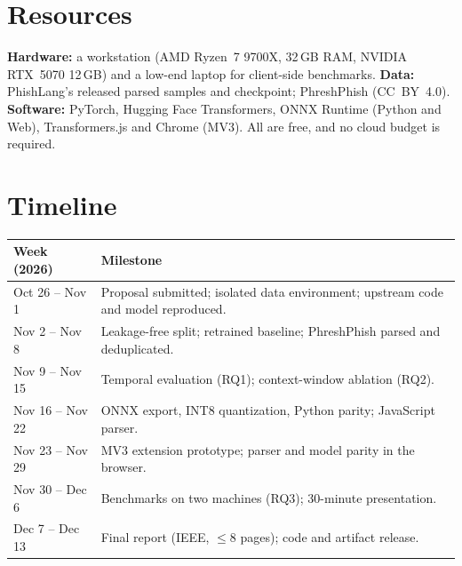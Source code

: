 \documentclass[11pt]{article}
\begin{document}
\section{Resources}
\textbf{Hardware:} a workstation (AMD Ryzen~7 9700X, 32\,GB RAM, NVIDIA RTX~5070 12\,GB) and a low-end laptop for client-side benchmarks. \textbf{Data:} PhishLang's released parsed samples and checkpoint; PhreshPhish (CC~BY~4.0). \textbf{Software:} PyTorch, Hugging Face Transformers, ONNX Runtime (Python and Web), Transformers.js and Chrome (MV3). All are free, and no cloud budget is required.

\section{Timeline}
{\small\noindent\begin{tabularx}{\linewidth}{@{}lX@{}}
\toprule
\textbf{Week (2026)} & \textbf{Milestone} \\
\midrule
Oct 26 -- Nov 1 & Proposal submitted; isolated data environment; upstream code and model reproduced. \\
Nov 2 -- Nov 8  & Leakage-free split; retrained baseline; PhreshPhish parsed and deduplicated. \\
Nov 9 -- Nov 15 & Temporal evaluation (RQ1); context-window ablation (RQ2). \\
Nov 16 -- Nov 22 & ONNX export, INT8 quantization, Python parity; JavaScript parser. \\
Nov 23 -- Nov 29 & MV3 extension prototype; parser and model parity in the browser. \\
Nov 30 -- Dec 6 & Benchmarks on two machines (RQ3); 30-minute presentation. \\
Dec 7 -- Dec 13 & Final report (IEEE, $\leq$8 pages); code and artifact release. \\
\bottomrule
\end{tabularx}}



\end{document}
